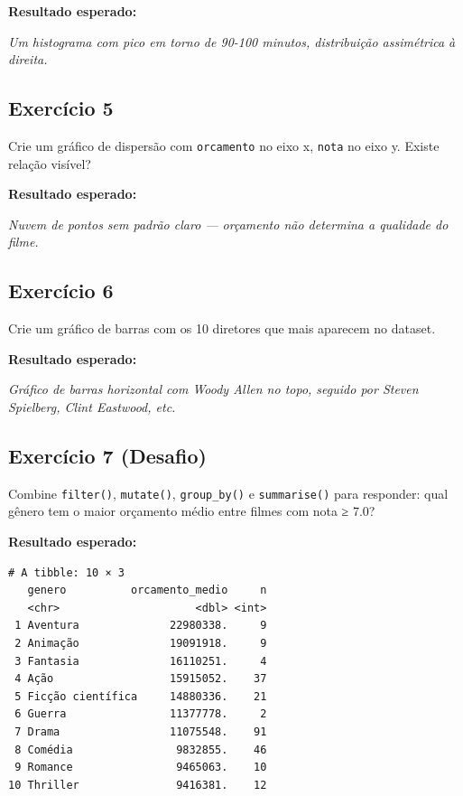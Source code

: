 \documentclass[
  letterpaper,
]{scrbook}
\begin{document}
\textbf{Resultado esperado:}

\emph{Um histograma com pico em torno de 90-100 minutos, distribuição
assimétrica à direita.}

\subsection{Exercício 5}\label{exercuxedcio-5-1}

Crie um gráfico de dispersão com \texttt{orcamento} no eixo x,
\texttt{nota} no eixo y. Existe relação visível?

\textbf{Resultado esperado:}

\emph{Nuvem de pontos sem padrão claro --- orçamento não determina a
qualidade do filme.}

\subsection{Exercício 6}\label{exercuxedcio-6}

Crie um gráfico de barras com os 10 diretores que mais aparecem no
dataset.

\textbf{Resultado esperado:}

\emph{Gráfico de barras horizontal com Woody Allen no topo, seguido por
Steven Spielberg, Clint Eastwood, etc.}

\subsection{Exercício 7 (Desafio)}\label{exercuxedcio-7-desafio}

Combine \texttt{filter()}, \texttt{mutate()}, \texttt{group\_by()} e
\texttt{summarise()} para responder: qual gênero tem o maior orçamento
médio entre filmes com nota ≥ 7.0?

\textbf{Resultado esperado:}

\begin{verbatim}
# A tibble: 10 × 3
   genero          orcamento_medio     n
   <chr>                     <dbl> <int>
 1 Aventura              22980338.     9
 2 Animação              19091918.     9
 3 Fantasia              16110251.     4
 4 Ação                  15915052.    37
 5 Ficção científica     14880336.    21
 6 Guerra                11377778.     2
 7 Drama                 11075548.    91
 8 Comédia                9832855.    46
 9 Romance                9465063.    10
10 Thriller               9416381.    12
\end{verbatim}
\end{document}
